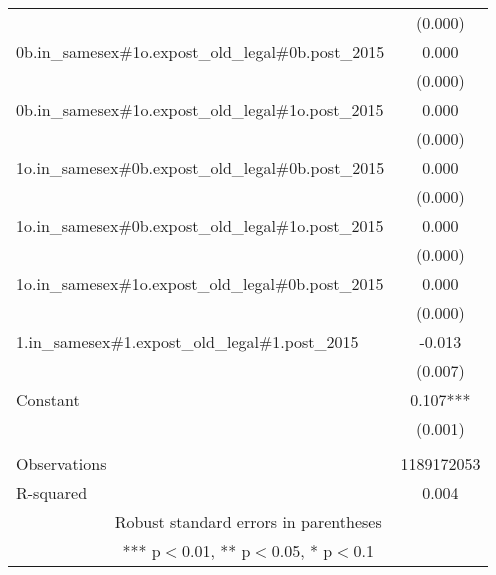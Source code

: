 \documentclass[]{article}
\begin{document}
\begin{tabular}{lc}
 & (0.000) \\
0b.in\_samesex\#1o.expost\_old\_legal\#0b.post\_2015 & 0.000 \\
 & (0.000) \\
0b.in\_samesex\#1o.expost\_old\_legal\#1o.post\_2015 & 0.000 \\
 & (0.000) \\
1o.in\_samesex\#0b.expost\_old\_legal\#0b.post\_2015 & 0.000 \\
 & (0.000) \\
1o.in\_samesex\#0b.expost\_old\_legal\#1o.post\_2015 & 0.000 \\
 & (0.000) \\
1o.in\_samesex\#1o.expost\_old\_legal\#0b.post\_2015 & 0.000 \\
 & (0.000) \\
1.in\_samesex\#1.expost\_old\_legal\#1.post\_2015 & -0.013 \\
 & (0.007) \\
Constant & 0.107*** \\
 & (0.001) \\
 &  \\
Observations & 1189172053 \\
 R-squared & 0.004 \\ \hline
\multicolumn{2}{c}{ Robust standard errors in parentheses} \\
\multicolumn{2}{c}{ *** p$<$0.01, ** p$<$0.05, * p$<$0.1} \\
\end{tabular}
\end{document}
